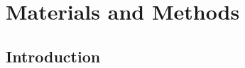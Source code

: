 
\section{Materials and Methods}
\vspace{-3em}
\subsection{Introduction}
\vspace{-2em}
\hspace{\parindent} \blindtext

